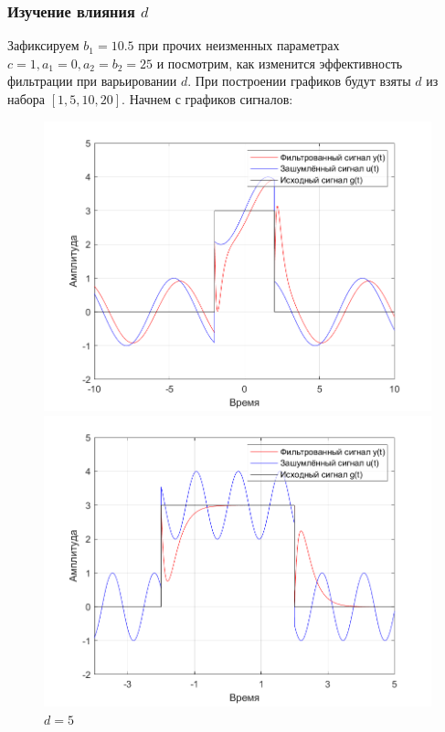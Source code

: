 \documentclass[a4paper]{article}
\begin{document}
\subsubsection{Изучение влияния $d$}

Зафиксируем $b_1 = 10.5$ при прочих неизменных параметрах $c = 1, a_1 = 0, a_2 = b_2 = 25$ и посмотрим, как изменится эффективность фильтрации при варьировании $d$. При построении графиков будут взяты $d$ из набора $[1, 5, 10, 20]$. Начнем с графиков сигналов:

\begin{figure}[H]
    \begin{minipage}{0.5\textwidth}
        \centering
        \includegraphics[width=\linewidth]{ex1_2/a1=0_a2=25_b1=10.5_b2=25_d=1/h2.png}
        \caption{$d=1$}
    \end{minipage}
    \begin{minipage}{0.5\textwidth}
        \centering
        \includegraphics[width=\linewidth]{ex1_2/a1=0_a2=25_b1=10.5_b2=25_d=5/h2.png}
        \caption{$d=5$}
    \end{minipage}
\end{figure}
\end{document}

